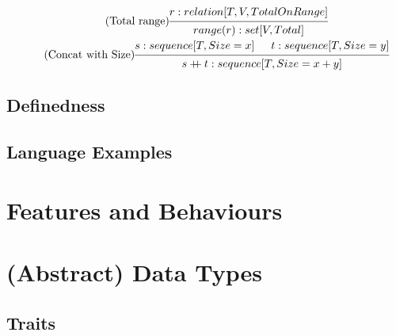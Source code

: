 \documentclass{article}
\newcommand{\concat}{%
  \mathbin{{+}\mspace{-8mu}{+}}%
}
\begin{document}
\begin{gather}
    \tag{Total range}
    \begin{prooftree}
        \hypo{r: relation[T, V, TotalOnRange]}
        \infer1{range(r): set[V, Total]}
    \end{prooftree}
    \\
    \tag{Concat with Size}
    \begin{prooftree}
        \hypo{s: sequence[T, Size=x]}
        \hypo{t: sequence[T, Size=y]}
        \infer2{s \concat t: sequence[T, Size=x+y]}
    \end{prooftree}
\end{gather}


\subsection{Definedness}

\subsection{Language Examples} %
\section{Features and Behaviours}



\section{(Abstract) Data Types}


\subsection{Traits}
\end{document}
